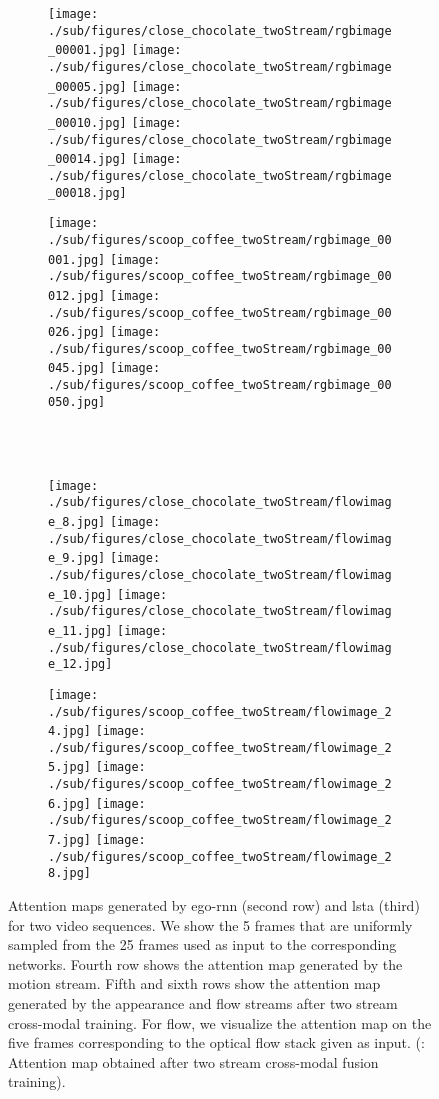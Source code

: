 \documentclass[10pt,twocolumn,letterpaper]{article}
\begin{document}
\begin{matrix*}[r]
\begin{figure*}[t]
        \begin{subfigure}[b]{0.4\textwidth}
			\texttt{[image: ./sub/figures/close\_chocolate\_twoStream/rgbimage\_00001.jpg]}
			\texttt{[image: ./sub/figures/close\_chocolate\_twoStream/rgbimage\_00005.jpg]}
			\texttt{[image: ./sub/figures/close\_chocolate\_twoStream/rgbimage\_00010.jpg]}
			\texttt{[image: ./sub/figures/close\_chocolate\_twoStream/rgbimage\_00014.jpg]}
			\texttt{[image: ./sub/figures/close\_chocolate\_twoStream/rgbimage\_00018.jpg]}
			\end{subfigure} \hskip 5mm
	        \begin{subfigure}[b]{0.4\textwidth}
			\texttt{[image: ./sub/figures/scoop\_coffee\_twoStream/rgbimage\_00001.jpg]}
			\texttt{[image: ./sub/figures/scoop\_coffee\_twoStream/rgbimage\_00012.jpg]}
			\texttt{[image: ./sub/figures/scoop\_coffee\_twoStream/rgbimage\_00026.jpg]}
			\texttt{[image: ./sub/figures/scoop\_coffee\_twoStream/rgbimage\_00045.jpg]}
			\texttt{[image: ./sub/figures/scoop\_coffee\_twoStream/rgbimage\_00050.jpg]}
		\end{subfigure} \\
	 \	
       \begin{subfigure}[b]{0.4\textwidth}
			\texttt{[image: ./sub/figures/close\_chocolate\_twoStream/flowimage\_8.jpg]}
			\texttt{[image: ./sub/figures/close\_chocolate\_twoStream/flowimage\_9.jpg]}
			\texttt{[image: ./sub/figures/close\_chocolate\_twoStream/flowimage\_10.jpg]}
			\texttt{[image: ./sub/figures/close\_chocolate\_twoStream/flowimage\_11.jpg]}
			\texttt{[image: ./sub/figures/close\_chocolate\_twoStream/flowimage\_12.jpg]}
			\end{subfigure} \hskip 5mm
	        \begin{subfigure}[b]{0.4\textwidth}
			\texttt{[image: ./sub/figures/scoop\_coffee\_twoStream/flowimage\_24.jpg]}
			\texttt{[image: ./sub/figures/scoop\_coffee\_twoStream/flowimage\_25.jpg]}
			\texttt{[image: ./sub/figures/scoop\_coffee\_twoStream/flowimage\_26.jpg]}
			\texttt{[image: ./sub/figures/scoop\_coffee\_twoStream/flowimage\_27.jpg]}
			\texttt{[image: ./sub/figures/scoop\_coffee\_twoStream/flowimage\_28.jpg]}
		\end{subfigure}
\caption{Attention maps generated by ego-rnn (second row) and \ac{lsta} (third) for two video sequences. We show the 5 frames that are uniformly sampled from the 25 frames used as input to the corresponding networks. Fourth row shows the attention map generated by the motion stream. Fifth and sixth rows show the attention map generated by the appearance and flow streams after two stream cross-modal training. For flow, we visualize the attention map on the five frames corresponding to the optical flow stack given as input. (: Attention map obtained after two stream cross-modal fusion training).}

\end{figure*}
\end{matrix*}
\end{document}
